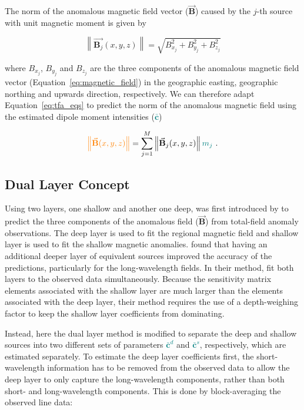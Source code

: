 The norm of the anomalous magnetic field vector ($\vec{\mathbf{B}}$) caused by the $j$-th source with unit magnetic moment is given by

\begin{equation}
    \left\lVert \vec{\mathbf{B}_j}(x,y,z) \right \rVert = \sqrt{B^2_{x_j} + B^2_{y_j} +B^2_{z_j}}
\end{equation}

\noindent
where $B_{x_j}$, $B_{y_j}$ and $B_{z_j}$ are the three components of the anomalous magnetic field vector (Equation~\ref{eq:magnetic_field}) in the geographic easting, geographic northing and upwards direction, respectively. We can therefore adapt Equation~\ref{eq:tfa_eqs} to predict the norm of the anomalous magnetic field using the estimated dipole moment intensities (\textcolor{teal}{$\bar{\mathbf{c}}$})

\begin{equation}
\textcolor{orange}{\left\lVert \vec{\mathbf{B}}(x,y,z) \right\rVert} = \sum_{j=1}^{M}  \left\lVert \vec{\mathbf{B}}_{j}(x,y,z) \right\rVert \textcolor{teal}{m_j}
\ .
\end{equation}


\subsection{Dual Layer Concept}

Using two layers, one shallow and another one deep, was first introduced by \citep{Li2020} to predict the three components of the anomalous field ($\vec{\mathbf{B}}$) from total-field anomaly observations.
The deep layer is used to fit the regional magnetic field and shallow layer is used to fit the shallow magnetic anomalies. 
\citep{Li2020} found that having an additional deeper layer of equivalent sources improved the accuracy of the predictions, particularly for the long‐wavelength fields. 
In their method, \citep{Li2020} fit both layers to the observed data simultaneously.
Because the sensitivity matrix elements associated with the shallow layer are much larger than the elements associated with the deep layer, their method requires the use of a depth-weighing factor to keep the shallow layer coefficients from dominating.

Instead, here the dual layer method is modified to separate the deep and shallow sources into two different sets of parameters \textcolor{teal}{$\bar{\mathbf{c}}^d$} and \textcolor{teal}{$\bar{\mathbf{c}}^s$}, respectively, which are estimated separately.
To estimate the deep layer coefficients first, the short-wavelength information has to be removed from the observed data to allow the deep layer to only capture the long-wavelength components, rather than both short- and long-wavelength components. 
This is done by block-averaging the observed line data:

